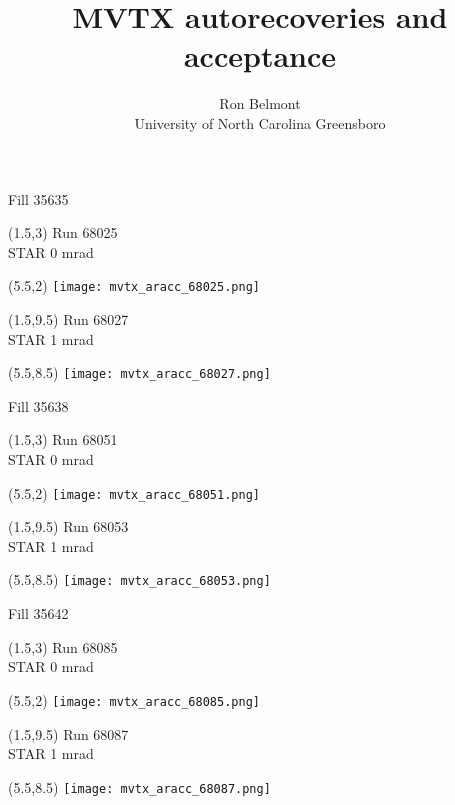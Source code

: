 \documentclass[aspectratio=169,compress,10pt]{beamer} %
\title[MVTX autorecoveries and acceptance \hspace{1.0cm} Slide \insertframenumber]{MVTX autorecoveries and acceptance}
\author[R. Belmont\hspace{6.25cm}]{Ron Belmont \\ University of North Carolina Greensboro}
\begin{document}





\begin{frame}{Fill 35635}
\begin{textblock}{3.5}(1.5,3)
Run 68025 \\
STAR 0 mrad
\end{textblock}
\begin{textblock}{10}(5.5,2)
\texttt{[image: mvtx\_aracc\_68025.png]}
\end{textblock}
\begin{textblock}{3.5}(1.5,9.5)
Run 68027 \\
STAR 1 mrad
\end{textblock}
\begin{textblock}{10}(5.5,8.5)
\texttt{[image: mvtx\_aracc\_68027.png]}
\end{textblock}
\end{frame}



\begin{frame}{Fill 35638}
\begin{textblock}{3.5}(1.5,3)
Run 68051 \\
STAR 0 mrad
\end{textblock}
\begin{textblock}{10}(5.5,2)
\texttt{[image: mvtx\_aracc\_68051.png]}
\end{textblock}
\begin{textblock}{3.5}(1.5,9.5)
Run 68053 \\
STAR 1 mrad
\end{textblock}
\begin{textblock}{10}(5.5,8.5)
\texttt{[image: mvtx\_aracc\_68053.png]}
\end{textblock}
\end{frame}



\begin{frame}{Fill 35642}
\begin{textblock}{3.5}(1.5,3)
Run 68085 \\
STAR 0 mrad
\end{textblock}
\begin{textblock}{10}(5.5,2)
\texttt{[image: mvtx\_aracc\_68085.png]}
\end{textblock}
\begin{textblock}{3.5}(1.5,9.5)
Run 68087 \\
STAR 1 mrad
\end{textblock}
\begin{textblock}{10}(5.5,8.5)
\texttt{[image: mvtx\_aracc\_68087.png]}
\end{textblock}
\end{frame}
\end{document}
